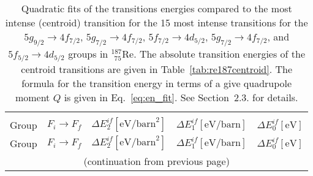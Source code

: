 \begin{longtable}{cc|rrr}
\caption{\label{tab:re187energ}%
Quadratic fits of the transitions energies compared to the most intense (centroid) transition for the 15 most intense transitions for the $5g_{9/2}\rightarrow4f_{7/2}$, $5g_{7/2}\rightarrow4f_{7/2}$, $5f_{7/2}\rightarrow4d_{5/2}$, $5g_{7/2}\rightarrow4f_{7/2}$, and $5f_{5/2}\rightarrow4d_{5/2}$ groups in $^{187}_{\,\;75}$Re. The absolute transition energies of the centroid transitions are given in Table~\ref{tab:re187centroid}. The formula for the transition energy in terms of a give quadrupole moment $Q$ is given in Eq.~\eqref{eq:en_fit}. See Section~2.3. for details.}
\\\hline\\[-10pt]\hline\\[-10pt]
\centering
Group& $F_i \rightarrow F_f$ & $\Delta E_2^{if} [\text{eV/barn}^2]$ & $\Delta E_1^{if} [\text{eV/barn}]$ & $\Delta E_0^{if} [\text{eV}]$\\[1pt]\hline\endfirsthead

Group& $F_i \rightarrow F_f$ & $\Delta E_2^{if} [\text{eV/barn}^2]$ & $\Delta E_1^{if} [\text{eV/barn}]$ & $\Delta E_0^{if} [\text{eV}]$\\[1pt]\hline
\multicolumn{5}{c}{{(continuation from previous page)}}\\
\endhead


\end{longtable}
